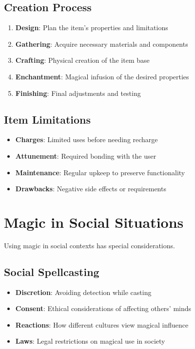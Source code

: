 \subsection*{Creation Process}
\begin{enumerate}
\item \textbf{Design}: Plan the item's properties and limitations
\item \textbf{Gathering}: Acquire necessary materials and components
\item \textbf{Crafting}: Physical creation of the item base
\item \textbf{Enchantment}: Magical infusion of the desired properties
\item \textbf{Finishing}: Final adjustments and testing
\end{enumerate}

\subsection*{Item Limitations}
\begin{itemize}
\item \textbf{Charges}: Limited uses before needing recharge
\item \textbf{Attunement}: Required bonding with the user
\item \textbf{Maintenance}: Regular upkeep to preserve functionality
\item \textbf{Drawbacks}: Negative side effects or requirements
\end{itemize}

\section{Magic in Social Situations} 

Using magic in social contexts has special considerations.

\subsection*{Social Spellcasting}
\begin{itemize}
\item \textbf{Discretion}: Avoiding detection while casting
\item \textbf{Consent}: Ethical considerations of affecting others' minds
\item \textbf{Reactions}: How different cultures view magical influence
\item \textbf{Laws}: Legal restrictions on magical use in society
\end{itemize}

